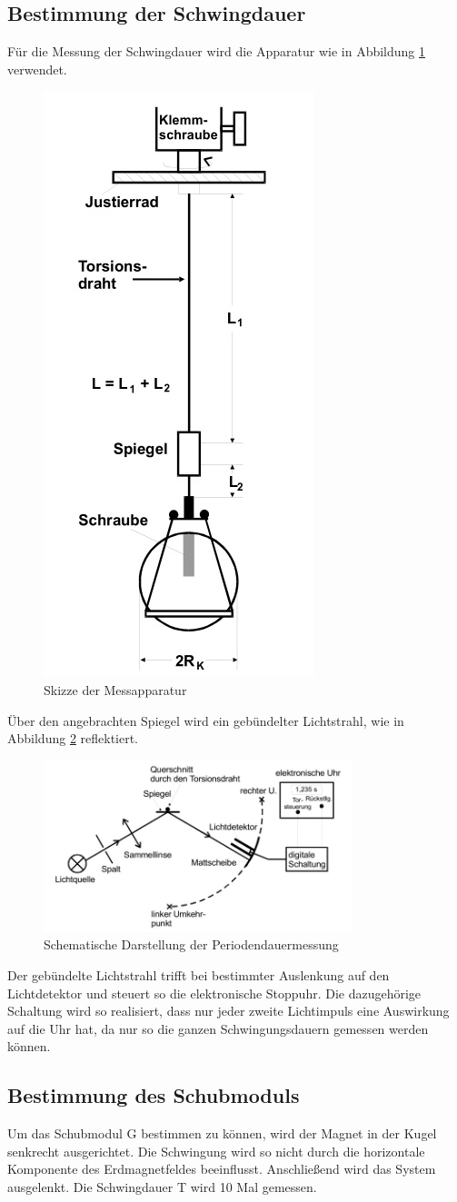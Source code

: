 \subsection{Bestimmung der Schwingdauer}
Für die Messung der Schwingdauer wird die Apparatur wie in Abbildung \ref{mess1}
verwendet.
\begin{figure}[H]
  \centering
  \includegraphics[height=0.5\textwidth]{bilder/aufbau.jpg}
  \caption{Skizze der Messapparatur\cite{102}}
  \label{mess1}
\end{figure}
Über den angebrachten Spiegel wird ein gebündelter Lichtstrahl, wie in
Abbildung \ref{periode} reflektiert.
\begin{figure}[H]
  \centering
  \includegraphics[width=0.8\textwidth]{bilder/periode.jpg}
  \caption{Schematische Darstellung der Periodendauermessung\cite{102}}
  \label{periode}
\end{figure}
Der gebündelte Lichtstrahl trifft bei bestimmter Auslenkung auf den Lichtdetektor
und steuert so die elektronische Stoppuhr. Die dazugehörige Schaltung wird so
realisiert, dass nur jeder zweite Lichtimpuls eine Auswirkung auf die Uhr hat,
da nur so die ganzen Schwingungsdauern gemessen werden können.
\subsection{Bestimmung des Schubmoduls}
Um das Schubmodul G bestimmen zu können, wird der Magnet in der Kugel senkrecht
ausgerichtet. Die Schwingung wird so nicht durch die horizontale Komponente des
Erdmagnetfeldes beeinflusst. Anschließend wird das System ausgelenkt. Die
Schwingdauer T wird 10 Mal gemessen.

